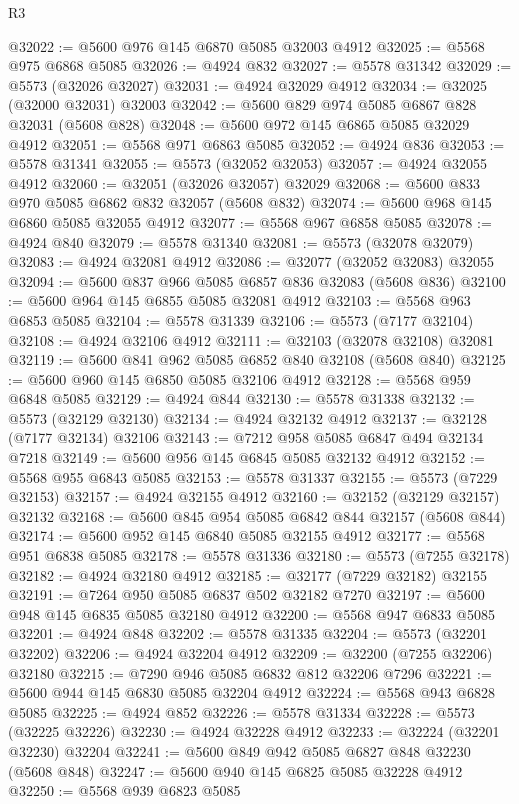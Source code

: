 \begin{lexlean}{R3}
\begin{coremodule}
@32022 := @5600 @976 @145 @6870 @5085 @32003 @4912
@32025 := @5568 @975 @6868 @5085
@32026 := @4924 @832
@32027 := @5578 @31342
@32029 := @5573 (@32026 @32027)
@32031 := @4924 @32029 @4912
@32034 := @32025 (@32000 @32031) @32003
@32042 := @5600 @829 @974 @5085 @6867 @828 @32031 (@5608 @828)
@32048 := @5600 @972 @145 @6865 @5085 @32029 @4912
@32051 := @5568 @971 @6863 @5085
@32052 := @4924 @836
@32053 := @5578 @31341
@32055 := @5573 (@32052 @32053)
@32057 := @4924 @32055 @4912
@32060 := @32051 (@32026 @32057) @32029
@32068 := @5600 @833 @970 @5085 @6862 @832 @32057 (@5608 @832)
@32074 := @5600 @968 @145 @6860 @5085 @32055 @4912
@32077 := @5568 @967 @6858 @5085
@32078 := @4924 @840
@32079 := @5578 @31340
@32081 := @5573 (@32078 @32079)
@32083 := @4924 @32081 @4912
@32086 := @32077 (@32052 @32083) @32055
@32094 := @5600 @837 @966 @5085 @6857 @836 @32083 (@5608 @836)
@32100 := @5600 @964 @145 @6855 @5085 @32081 @4912
@32103 := @5568 @963 @6853 @5085
@32104 := @5578 @31339
@32106 := @5573 (@7177 @32104)
@32108 := @4924 @32106 @4912
@32111 := @32103 (@32078 @32108) @32081
@32119 := @5600 @841 @962 @5085 @6852 @840 @32108 (@5608 @840)
@32125 := @5600 @960 @145 @6850 @5085 @32106 @4912
@32128 := @5568 @959 @6848 @5085
@32129 := @4924 @844
@32130 := @5578 @31338
@32132 := @5573 (@32129 @32130)
@32134 := @4924 @32132 @4912
@32137 := @32128 (@7177 @32134) @32106
@32143 := @7212 @958 @5085 @6847 @494 @32134 @7218
@32149 := @5600 @956 @145 @6845 @5085 @32132 @4912
@32152 := @5568 @955 @6843 @5085
@32153 := @5578 @31337
@32155 := @5573 (@7229 @32153)
@32157 := @4924 @32155 @4912
@32160 := @32152 (@32129 @32157) @32132
@32168 := @5600 @845 @954 @5085 @6842 @844 @32157 (@5608 @844)
@32174 := @5600 @952 @145 @6840 @5085 @32155 @4912
@32177 := @5568 @951 @6838 @5085
@32178 := @5578 @31336
@32180 := @5573 (@7255 @32178)
@32182 := @4924 @32180 @4912
@32185 := @32177 (@7229 @32182) @32155
@32191 := @7264 @950 @5085 @6837 @502 @32182 @7270
@32197 := @5600 @948 @145 @6835 @5085 @32180 @4912
@32200 := @5568 @947 @6833 @5085
@32201 := @4924 @848
@32202 := @5578 @31335
@32204 := @5573 (@32201 @32202)
@32206 := @4924 @32204 @4912
@32209 := @32200 (@7255 @32206) @32180
@32215 := @7290 @946 @5085 @6832 @812 @32206 @7296
@32221 := @5600 @944 @145 @6830 @5085 @32204 @4912
@32224 := @5568 @943 @6828 @5085
@32225 := @4924 @852
@32226 := @5578 @31334
@32228 := @5573 (@32225 @32226)
@32230 := @4924 @32228 @4912
@32233 := @32224 (@32201 @32230) @32204
@32241 := @5600 @849 @942 @5085 @6827 @848 @32230 (@5608 @848)
@32247 := @5600 @940 @145 @6825 @5085 @32228 @4912
@32250 := @5568 @939 @6823 @5085

\end{coremodule}
\end{lexlean}
